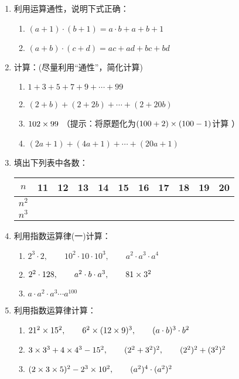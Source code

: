 \begin{enumerate}
\item 利用运算通性，说明下式正确：
\begin{enumerate}
    \item $(a+1)\cdot (b+1)=a\cdot b+a+b+1$
    \item $(a+b)\cdot (c+d)=ac+ad+bc+bd$
\end{enumerate}

\item 计算：(尽量利用“通性”，简化计算)
\begin{enumerate}
    \item $1+3+5+7+9+\cdots+99$
    \item $(2+b)+(2+2b)+\cdots+(2+20b)$
    \item $102\times 99$ （提示：将原题化为$(100+2)\times(100-1)$计算 ）
    \item $(2a+1)+(4a+1)+\cdots +(20a+1)$
\end{enumerate}

\item 填出下列表中各数：
\begin{center}
    \begin{tabular}{c|cccccccccc}
        \hline
        $n$ & 11&12&13&14&15&16&17&18&19&20\\
\hline
$n^2$\\
$n^3$\\
        \hline
    \end{tabular}
\end{center}

\item 利用指数运算律(一)计算：
\begin{enumerate}
    \item $2^3\cdot 2,\qquad 10^2\cdot 10\cdot 10^3,\qquad a^2\cdot a^3\cdot a^4$
    \item $2^2\cdot 128,\qquad a^2\cdot b\cdot a^3,\qquad 81\times 3^2$
    \item $a\cdot a^2\cdot a^3\cdots a^{100}$
\end{enumerate}

\item 利用指数运算律计算：
\begin{enumerate}
    \item $21^2\times 15^2,\qquad 6^2\times(12\times 9)^3,\qquad (a\cdot b)^3\cdot b^2$
    \item $3\times 3^3+4\times 4^3-15^2,\qquad (2^2+3^2)^2,\qquad (2^2)^2+(3^2)^2$
    \item $(2\times3\times5)^2-2^3\times10^2,\qquad (a^2)^4\cdot (a^2)^2$
\end{enumerate}


\end{enumerate}

